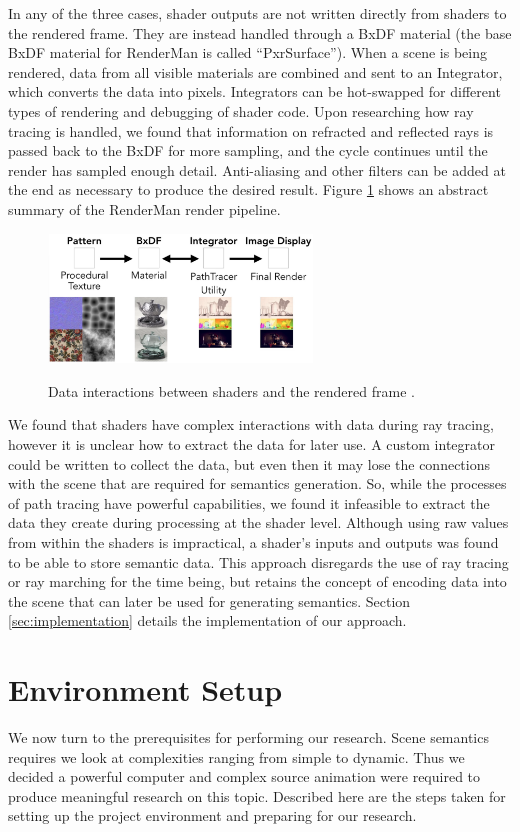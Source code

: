 \documentclass[conference]{IEEEtran}
\begin{document}
In any of the three cases, shader outputs are not written directly
from shaders to the rendered frame. They are instead handled through a BxDF material
(the base BxDF material for RenderMan is called ``PxrSurface'').
When a scene is being rendered,
data from all visible materials are combined and sent to an Integrator,
which converts the data into pixels.
Integrators can be hot-swapped for different types of rendering and debugging of
shader code.
Upon researching how ray tracing is handled, we found that information
on refracted and reflected rays is passed
back to the BxDF for more sampling, and the cycle continues until the render has sampled
enough detail.
Anti-aliasing and other filters can be added at the end as necessary
to produce the desired result.
Figure \ref{fig:interaction} shows an abstract summary of the RenderMan render pipeline.

\begin{figure}[htbp]
\centering
{\includegraphics[width=7cm]{interaction.png}}
\caption{Data interactions between shaders and the rendered frame  \cite{renderman}.}
\label{fig:interaction}
\end{figure}

We found that shaders have complex interactions with data during ray tracing,
however it is unclear how to extract the data for later use.
A custom integrator could be written to collect the data, but even then it
may lose the connections with the scene that are required for semantics generation.
So, while the processes of path tracing have powerful capabilities,
we found it infeasible to extract the data they create during processing
at the shader level.
Although using raw values from within the shaders is impractical,
a shader's inputs and outputs was found to be able to store semantic data.
This approach disregards the use of ray tracing or ray marching for the time being,
but retains the concept of encoding data into the scene that can later be used
for generating semantics.
Section \ref{sec:implementation} details the implementation of our approach.

\section{Environment Setup}
\label{sec:environment}
We now turn to the prerequisites for performing our research.
Scene semantics requires we look at complexities ranging from simple to dynamic.
Thus we decided a powerful computer and complex source animation were required
to produce meaningful research on this topic.
Described here are the steps taken for setting up the project
environment and preparing for our research.
\end{document}
